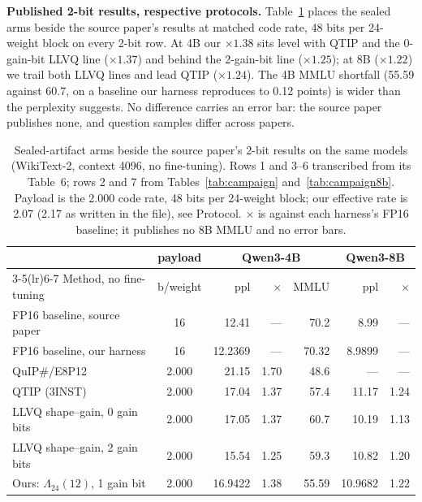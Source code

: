 \textbf{Published 2-bit results, respective protocols.} Table~\ref{tab:lit} places the
sealed arms beside the source paper's results at matched code rate,
48 bits per 24-weight block on every 2-bit row. At 4B our $\times1.38$ sits
level with QTIP and the 0-gain-bit LLVQ line ($\times1.37$) and behind the
2-gain-bit line ($\times1.25$); at 8B ($\times1.22$) we trail both LLVQ
lines and lead QTIP ($\times1.24$). The 4B MMLU shortfall (55.59 against
60.7, on a baseline our harness reproduces to 0.12 points) is wider than
the perplexity suggests. No difference carries an error bar: the
source paper publishes none, and question samples differ across papers.

\begin{table}[t]
\centering
\small
\setlength{\tabcolsep}{4.5pt}
\begin{tabular}{lcrrrrr}
\toprule
 & payload & \multicolumn{3}{c}{Qwen3-4B} & \multicolumn{2}{c}{Qwen3-8B} \\
\cmidrule(lr){3-5}\cmidrule(lr){6-7}
Method, no fine-tuning & b/weight & ppl & $\times$ & MMLU & ppl & $\times$ \\
\midrule
FP16 baseline, source paper & 16 & 12.41 & --- & 70.2 & 8.99 & --- \\
FP16 baseline, our harness & 16 & 12.2369 & --- & 70.32 & 8.9899 & --- \\
\midrule
QuIP\#/E8P12 & 2.000 & 21.15 & 1.70 & 48.6 & --- & --- \\
QTIP (3INST) & 2.000 & 17.04 & 1.37 & 57.4 & 11.17 & 1.24 \\
LLVQ shape--gain, 0 gain bits & 2.000 & 17.05 & 1.37 & 60.7 & 10.19 & 1.13 \\
LLVQ shape--gain, 2 gain bits & 2.000 & 15.54 & 1.25 & 59.3 & 10.82 & 1.20 \\
\midrule
Ours: $\Lambda_{24}(12)$, 1 gain bit & 2.000 & 16.9422 & 1.38 & 55.59 & 10.9682 & 1.22 \\
\bottomrule
\end{tabular}
\caption{Sealed-artifact arms beside the source paper's 2-bit results on
the same models (WikiText-2, context 4096, no fine-tuning). Rows 1 and 3--6
transcribed from its Table~6; rows 2 and 7 from
Tables~\ref{tab:campaign} and~\ref{tab:campaign8b}. Payload is the 2.000
code rate, 48 bits per 24-weight block; our effective rate is 2.07 (2.17 as
written in the file), see Protocol. $\times$ is against each harness's FP16 baseline; it publishes
no 8B MMLU and no error bars.}
\label{tab:lit}
\end{table}
